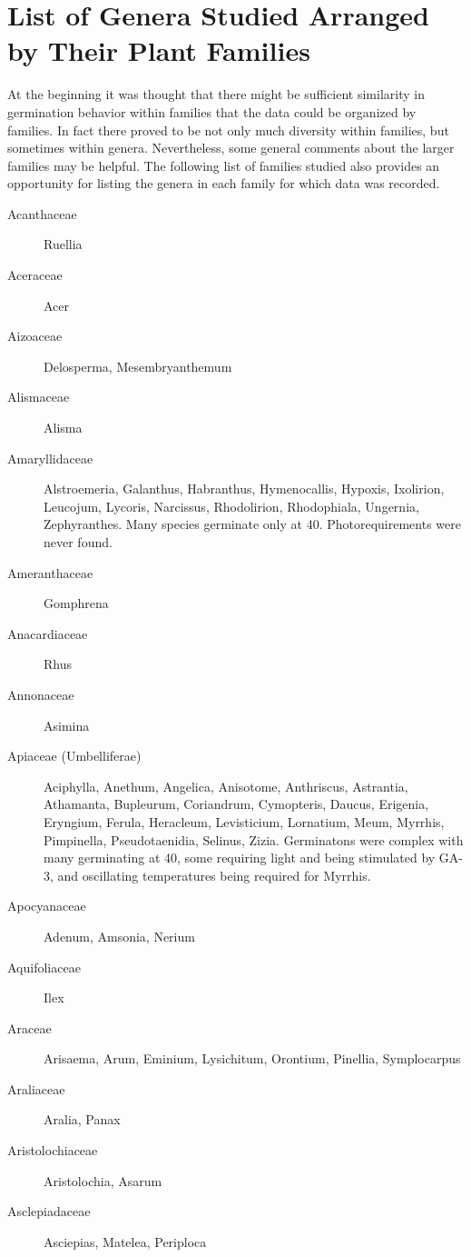 \chapter[Genera Studied]{List of Genera Studied Arranged by Their Plant Families}

At the beginning it was thought that there might be sufficient similarity in
germination behavior within families that the data could be organized by families. In
fact there proved to be not only much diversity within families, but sometimes within
genera. Nevertheless, some general comments about the larger families may be
helpful. The following list of families studied also provides an opportunity for listing the
genera in each family for which data was recorded.

\begin{description}
\item[Acanthaceae] Ruellia
\item[Aceraceae] Acer
\item[Aizoaceae] Delosperma, Mesembryanthemum
\item[Alismaceae] Alisma
\item[Amaryllidaceae] Alstroemeria, Galanthus, Habranthus, Hymenocallis,
Hypoxis, Ixolirion, Leucojum, Lycoris, Narcissus, Rhodolirion, Rhodophiala, Ungernia,
Zephyranthes. Many species germinate only at 40. Photorequirements were never
found.
\item[Ameranthaceae] Gomphrena
\item[Anacardiaceae] Rhus
\item[Annonaceae] Asimina
\item[Apiaceae (Umbelliferae)] Aciphylla, Anethum, Angelica, Anisotome,
Anthriscus, Astrantia, Athamanta, Bupleurum, Coriandrum, Cymopteris, Daucus,
Erigenia, Eryngium, Ferula, Heracleum, Levisticium, Lornatium, Meum, Myrrhis,
Pimpinella, Pseudotaenidia, Selinus, Zizia. Germinatons were complex with many
germinating at 40, some requiring light and being stimulated by GA-3, and oscillating
temperatures being required for Myrrhis.
\item[Apocyanaceae] Adenum, Amsonia, Nerium
\item[Aquifoliaceae] Ilex
\item[Araceae] Arisaema, Arum, Eminium, Lysichitum, Orontium, Pinellia,
Symplocarpus
\item[Araliaceae] Aralia, Panax
\item[Aristolochiaceae] Aristolochia, Asarum
\item[Asclepiadaceae] Asciepias, Matelea, Periploca

\end{description}
